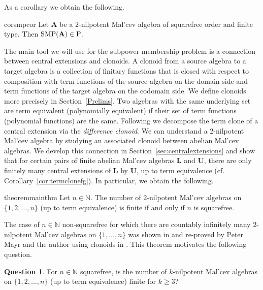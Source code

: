 \documentclass[12pt]{amsart}
\numberwithin{equation}{section}
\theoremstyle{plain}
\theoremstyle{definition}
\newtheorem{que}[theorem]{Question}
\newcommand{\A}{\mathbf{A}}
\renewcommand{\L}{\mathbf{L}}
\newcommand{\N}{\mathbb{N}}
\newcommand{\U}{\mathbf{U}}
\begin{document}
As a corollary we obtain the following.

\begin{restatable}{cor}{smpcor}
   \label{thm:SMPcorollary}
  Let $\A$ be a $2$-nilpotent Mal'cev algebra of squarefree order and finite type. 
  Then $\textup{SMP}(\A) \in \textup{P}$.
\end{restatable}

The main tool we will use for the subpower membership problem 
  is a connection between central extensions and clonoids. 
A clonoid from a source algebra to a target algebra is a collection of finitary functions 
  that is closed with respect to composition with term functions of the source algebra on the domain side 
  and term functions of the target algebra on the codomain side. 
We define clonoids more precisely in Section~\ref{Prelims}.
Two algebras with the same underlying set are term equivalent (polynomially equivalent) 
  if their set of term functions (polynomial functions) are the same.
Following \cite{Kom:SMP} we decompose the term clone of a central extension 
  via the \emph{difference clonoid}.
We can understand a $2$-nilpotent Mal'cev algebra by studying an associated clonoid 
  between abelian Mal'cev algebras. 
We develop this connection in Section~\ref{sec:centralextensions} and show that 
  for certain pairs of finite abelian Mal'cev algebras $\L$ and $\U$, 
  there are only finitely many central extensions of $\L$ by $\U$, 
  up to term equivalence (cf. Corollary~\ref{cor:termclonefg}).
In particular, we obtain the following.

\begin{restatable}{theorem}{mainthm}
\label{finitelymany}
     Let $n \in \N$. The number of $2$-nilpotent Mal'cev algebras on $\{1,2, \ldots,n\}$ (up to term equivalence) is finite
     if and only if $n$ is squarefree.
\end{restatable}

The case of $n \in \N$ non-squarefree for which there are countably infinitely many $2$-nilpotent 
  Mal'cev algebras on $\{ 1, \dots, n \}$ was shown in \cite{Id:CCMO} 
  and re-proved by Peter Mayr and the author using clonoids in \cite{MaWy:CBM}. 
This theorem motivates the following question.

\begin{que} \label{que:nilpotent}
  For $n \in \N$ squarefree, is the number of $k$-nilpotent Mal'cev algebras on $\{1,2, \dots, n \}$ 
  (up to term equivalence) finite for $k \ge 3$?
\end{que}
\end{document}

